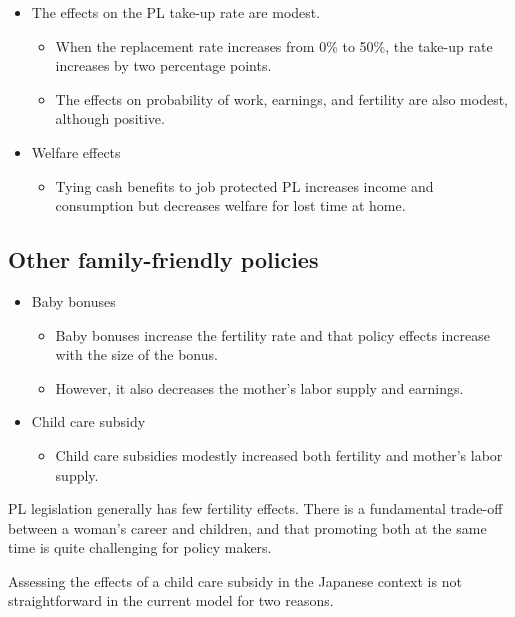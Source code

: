 \documentclass[../root]{subfiles}
\begin{document}
    \begin{itemize}
      \item The effects on the PL take-up rate are modest.
      \begin{itemize}
        \item When the replacement rate increases from 0\% to 50\%, the take-up rate increases by two percentage points.
        \item The effects on probability of work, earnings, and fertility are also modest, although positive.
      \end{itemize}
      \item Welfare effects
      \begin{itemize}
        \item Tying cash benefits to job protected PL increases income and consumption but decreases welfare for lost time at home.
      \end{itemize}
    \end{itemize}



    \subsection{Other family-friendly policies}

    \begin{itemize}
      \item Baby bonuses
      \begin{itemize}
        \item Baby bonuses increase the fertility rate and that policy effects increase with the size of the bonus.
        \item However, it also decreases the mother’s labor supply and earnings.
      \end{itemize}
      \item Child care subsidy
      \begin{itemize}
        \item Child care subsidies modestly increased both fertility and mother’s labor supply.
      \end{itemize}
    \end{itemize}

    PL legislation generally has few fertility effects. There is a fundamental trade-off between a woman’s career and children, and that promoting both at the same time is quite challenging for policy makers.

    Assessing the effects of a child care subsidy in the Japanese context is not straightforward in the current model for two reasons.
\end{document}
